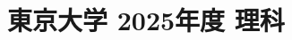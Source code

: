 ﻿\documentclass[../../uem_tok_q.tex]{subfiles}
\begin{document}
    \section{東京大学 2025年度 理科}
    \subsection{　}
    
    \vfill
    \subsection{　}
    
    \vfill
    \newpage
    \subsection{　}
    
    \vfill
    \subsection{　}
    
    \vfill
    \newpage
    \subsection{　}
    
    \vfill
    \subsection{　}
    
    \vfill
\end{document}
